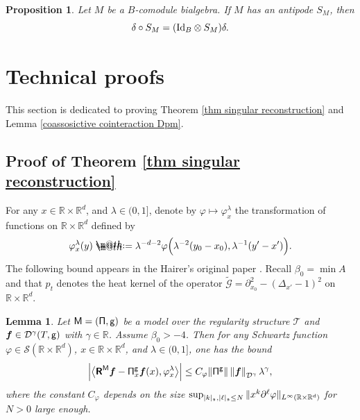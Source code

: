 \documentclass[10pt, reqno]{amsart}
\makeatletter
\numberwithin{subsection}{section}
\numberwithin{subsubsection}{subsection}
\numberwithin{equation}{section} %
\theoremstyle{mystyle}
\newtheorem{lem}[thm]{\hspace{-0.14cm}  {Lemma} }%
\newtheorem{prop}[thm]{\hspace{-0.13cm} {Proposition}}%
\theoremstyle{mystyle2}
\theoremstyle{mystyle3}
\newcommand{\iden}{\text{\rm Id}}
\newcommand{\bsf}{\boldsymbol{f}}
\newcommand\bbR{\mathbb{R}}
\newcommand{\mcD}{\mathcal{D}}
\newcommand{\mcG}{\mathcal{G}}
\newcommand\mcS{\mathcal{S}}
\newcommand*{\defeq}{\mathrel{\rlap{%
                     \raisebox{0.3ex}{$\m@th\cdot$}}%
                     \raisebox{-0.3ex}{$\m@th\cdot$}}%
                     =}
\makeatother
\begin{document}
\medskip

\begin{prop} \cite[Proposition 2]{Foissy16} \label{*compatibility antipode}
Let $M$ be a $B$-comodule bialgebra. If $M$ has an antipode $S_M$, then 
$$
\delta\circ S_M=(\iden_B\otimes S_M)\delta.
$$
\end{prop}



\bigskip



\section{Technical proofs}
\label{SectionAppendixProofs}

This section is dedicated to proving Theorem \ref{thm singular reconstruction} and Lemma \ref{coassosictive cointeraction Dpm}.


\bigskip



\subsection{Proof of Theorem \ref{thm singular reconstruction}}
\label{Proof of singular reconstruction}

For any $x\in\bbR\times\bbR^d$, and $\lambda\in(0,1]$, denote by $\varphi\mapsto\varphi_x^\lambda$ the transformation of functions on $\bbR\times\bbR^d$ defined by
$$
\varphi_x^\lambda(y) \defeq  \lambda^{-d-2}\varphi\Big(\lambda^{-2}(y_0-x_0),\lambda^{-1}(y'-x')\Big).
$$
The following bound appears in the Hairer's original paper \cite{Hai14}. Recall $\beta_0=\min A$ and that $p_t$ denotes the heat kernel of the operator $\widetilde{\mcG}=\partial_{x_0}^2-(\Delta_{x'}-1)^2$ on $\bbR\times\bbR^d$.

\medskip

\begin{lem}
Let $\sf M=(\Pi,g)$ be a model over the regularity structure $\mathscr{T}$ and $\bsf\in\mcD^\gamma(T,{\sf g})$ with $\gamma\in\bbR$.
Assume $\beta_0>-4$. Then for any Schwartz function $\varphi\in \mcS(\bbR\times\bbR^d)$, $x\in\bbR\times\bbR^d$, and $\lambda\in(0,1]$, one has the bound
\begin{align*}
\left|\big\langle \textbf{\textsf{R}}^{\sf M}\bsf-{\sf\Pi}_x^{\sf g}\bsf(x),\varphi_x^\lambda \big\rangle\right|
\le C_\varphi\|{\sf\Pi}^{\sf g}\|\left\|\bsf\right\|_{\mcD^\gamma}\lambda^\gamma,
\end{align*}
where the constant $C_\varphi$ depends on the size $\sup_{|k|_{\frak{s}},|\ell|_{\frak{s}}\le N}\|x^k\partial^\ell\varphi\|_{L^\infty(\bbR\times\bbR^d)}$ for $N>0$ large enough.
\end{lem}
\end{document}
